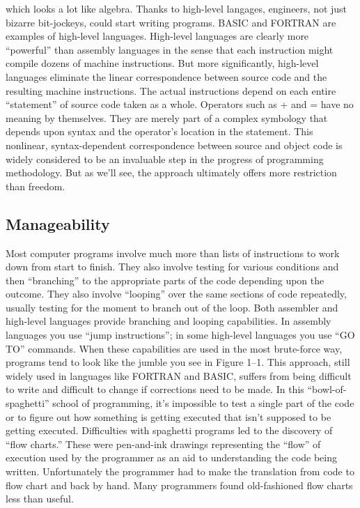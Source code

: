 which looks a lot like algebra. Thanks to high-level langages, engineers,
not just bizarre bit-jockeys, could start writing programs. BASIC
and FORTRAN are examples of high-level languages. High-level languages
are clearly more {}``powerful'' than assembly languages in the sense
that each instruction might compile dozens of machine instructions.
But more significantly, high-level languages eliminate the linear
correspondence between source code and the resulting machine instructions.
The actual instructions depend on each entire {}``statement'' of
source code taken as a whole. Operators such as + and = have no meaning
by themselves. They are merely part of a complex symbology that depends
upon syntax and the operator's location in the statement. This nonlinear,
syntax-dependent correspondence between source and object code is
widely considered to be an invaluable step in the progress of programming
methodology. But as we'll see, the approach ultimately offers more
restriction than freedom.


\subsection*{Manageability}

Most computer programs involve much more than lists of instructions
to work down from start to finish. They also involve testing for various
conditions and then {}``branching'' to the appropriate parts of the
code depending upon the outcome. They also involve {}``looping''
over the same sections of code repeatedly, usually testing for the
moment to branch out of the loop. Both assembler and high-level languages
provide branching and looping capabilities. In assembly languages
you use {}``jump instructions''; in some high-level languages you
use {}``GO TO'' commands. When these capabilities are used in the
most brute-force way, programs tend to look like the jumble you see
in Figure 1--1. This approach, still widely used in languages like
FORTRAN and BASIC, suffers from being difficult to write and difficult
to change if corrections need to be made. In this {}``bowl-of-spaghetti''
school of programming, it's impossible to test a single part of the
code or to figure out how something is getting executed that isn't
supposed to be getting executed. Difficulties with spaghetti programs
led to the discovery of {}``flow charts.'' These were pen-and-ink
drawings representing the {}``flow'' of execution used by the programmer
as an aid to understanding the code being written. Unfortunately the
programmer had to make the translation from code to flow chart and
back by hand. Many programmers found old-fashioned flow charts less
than useful.


